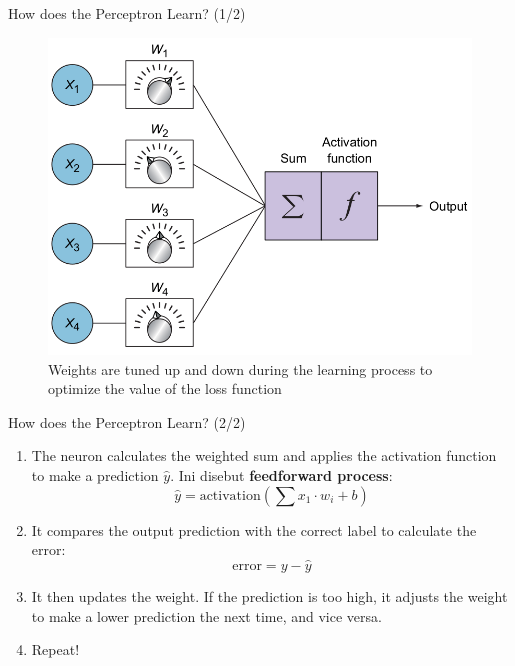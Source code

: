 \documentclass{beamer}
\begin{document}
\begin{frame}{How does the Perceptron Learn? (1/2)}
	\begin{figure}[ht]
	\centering
	\includegraphics[scale=0.25]{images/perceptron-how}
	\caption{Weights are tuned up and down during the learning process to optimize the value of the loss function}
\end{figure}				
\end{frame}

\begin{frame}{How does the Perceptron Learn? (2/2)}
	\begin{enumerate}
		\item<2-> The neuron calculates the weighted sum and applies the activation function to make a prediction $\hat{y}$. Ini disebut \textbf{feedforward process}:
		\begin{equation*}
			\hat{y} = \text{activation}\left( \sum{x_1 \cdot w_i + b} \right)
		\end{equation*}
		\item<3-> It compares the output prediction with the correct label to calculate the error:
		\begin{equation*}
			\text{error} = y - \hat{y}
		\end{equation*}
		\item<4-> It then updates the weight. If the prediction is too high, it adjusts the weight to make a lower prediction the next time, and vice versa.
		\item<5-> Repeat!
	\end{enumerate}
\end{frame}
\end{document}
